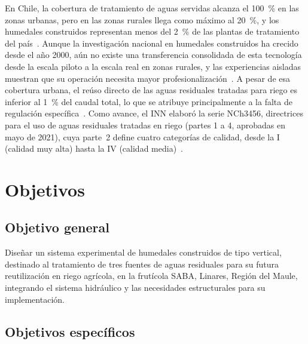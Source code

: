 En Chile, la cobertura de tratamiento de aguas servidas alcanza el \qty{100}{\percent} en las zonas urbanas, pero en las zonas rurales llega como máximo al \qty{20}{\percent}, y los humedales construidos representan menos del \qty{2}{\percent} de las plantas de tratamiento del país~\parencite{vera2016humedales}.
Aunque la investigación nacional en humedales construidos ha crecido desde el año 2000, aún no existe una transferencia consolidada de esta tecnología desde la escala piloto a la escala real en zonas rurales, y las experiencias aisladas muestran que su operación necesita mayor profesionalización~\parencite{vidal2023desarrollo}.
A pesar de esa cobertura urbana, el reúso directo de las aguas residuales tratadas para riego es inferior al \qty{1}{\percent} del caudal total, lo que se atribuye principalmente a la falta de regulación específica~\parencite{verapuerto2022reclamation}.
Como avance, el INN elaboró la serie NCh3456, directrices para el uso de aguas residuales tratadas en riego (partes 1 a 4, aprobadas en mayo de 2021), cuya parte~2 define cuatro categorías de calidad, desde la I (calidad muy alta) hasta la IV (calidad media)~\parencite{verapuerto2022reclamation}.

\section{Objetivos}
\label{sec:objetivos}


\subsection{Objetivo general}

Diseñar un sistema experimental de humedales construidos de tipo vertical, destinado al tratamiento de tres fuentes de aguas residuales para su futura reutilización en riego agrícola, en la frutícola SABA, Linares, Región del Maule, integrando el sistema hidráulico y las necesidades estructurales para su implementación.

\subsection{Objetivos específicos}

